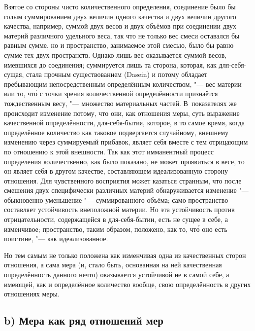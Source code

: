 Взятое со стороны чисто количественного определения, соединение было бы голым
суммированием двух величин одного качества и двух величин другого качества,
например, суммой двух весов и двух объёмов при соединении двух материй
различного удельного веса, так что не только вес смеси оставался бы равным
сумме, но и пространство, занимаемое этой смесью, было бы равно сумме тех двух
пространств. Однако лишь вес оказывается суммой весов, имевшихся до соединения;
суммируется лишь та сторона, которая, как для-себя-сущая, стала прочным
существованием (Dasein) и потому обладает пребывающим непосредственным
определённым количеством, "--- вес материи или то, чт\'{о} с точки зрения
количественной определённости признаётся тождественным весу, "--- множество
материальных частей. В~показателях же происходит изменение потому, что они, как
отношения меры, суть выражение качественной определённости, для-себя-бытия,
которое, в то самое время, когда определённое количество как таковое
подвергается случайному, внешнему изменению через суммируемый прибавок, являет
себя вместе с тем отрицающим по отношению к этой внешности. Так как этот
имманентный процесс определения количественно, как было показано, не может
проявиться в весе, то он являет себя в другом качестве, составляющем
идеализованную сторону отношения. Для чувственного восприятия может казаться
странным, что после смешения двух специфически различных материй обнаруживается
изменение "--- обыкновенно уменьшение "--- суммированного объёма; само
пространство составляет устойчивость внеположной материи. Но эта устойчивость
против отрицательности, содержащейся в для-себя-бытии, есть не сущее в себе, а
изменчивое; пространство, таким образом, положено, как то, чт\'{о} оно есть
поистине, "--- как идеализованное.

Но тем самым не только положена как изменчивая одна из качественных сторон
отношения, а сама мера (и, стало быть, основанная на ней качественная
определённость данного нечто) оказывается устойчивой не в самой себе, а
имеющей, как и определённое количество вообще, свою определённость в других
отношениях меры.

\subsection[b) Мера как ряд отношений мер]{b) Мера как ряд отношений мер}

